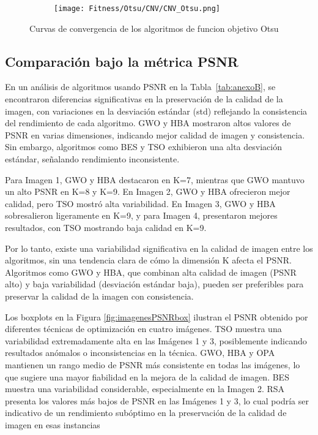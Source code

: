 \documentclass[conference]{IEEEtran}
\begin{document}
\begin{figure}
	\centering
	\begin{subfigure}{0.5\textwidth}
		\texttt{[image: Fitness/Otsu/CNV/CNV\_Otsu.png]}
	\end{subfigure}
	\caption{Curvas de convergencia de los algoritmos de funcion objetivo Otsu}
	\label{fig:imagenes}    
\end{figure}


\subsection{Comparación bajo la métrica PSNR}
\noindent En un análisis de algoritmos usando PSNR en la Tabla~\ref{tab:anexoB}, se encontraron diferencias significativas en la preservación de la calidad de la imagen, con variaciones en la desviación estándar (std) reflejando la consistencia del rendimiento de cada algoritmo. GWO y HBA mostraron altos valores de PSNR en varias dimensiones, indicando mejor calidad de imagen y consistencia. Sin embargo, algoritmos como BES y TSO exhibieron una alta desviación estándar, señalando rendimiento inconsistente.

\noindent Para Imagen 1, GWO y HBA destacaron en K=7, mientras que GWO mantuvo un alto PSNR en K=8 y K=9. En Imagen 2, GWO y HBA ofrecieron mejor calidad, pero TSO mostró alta variabilidad. En Imagen 3, GWO y HBA sobresalieron ligeramente en K=9, y para Imagen 4, presentaron mejores resultados, con TSO mostrando baja calidad en K=9.

\noindent Por lo tanto, existe una variabilidad significativa en la calidad de imagen entre los algoritmos, sin una tendencia clara de cómo la dimensión K afecta el PSNR. Algoritmos como GWO y HBA, que combinan alta calidad de imagen (PSNR alto) y baja variabilidad (desviación estándar baja), pueden ser preferibles para preservar la calidad de la imagen con consistencia.

\noindent Los boxplots en la Figura \ref{fig:imagenesPSNRbox} ilustran el PSNR obtenido por diferentes técnicas de optimización en cuatro imágenes. TSO muestra una variabilidad extremadamente alta en las Imágenes 1 y 3, posiblemente indicando resultados anómalos o inconsistencias en la técnica. GWO, HBA y OPA mantienen un rango medio de PSNR más consistente en todas las imágenes, lo que sugiere una mayor fiabilidad en la mejora de la calidad de imagen. BES muestra una variabilidad considerable, especialmente en la Imagen 2. RSA presenta los valores más bajos de PSNR en las Imágenes 1 y 3, lo cual podría ser indicativo de un rendimiento subóptimo en la preservación de la calidad de imagen en esas instancias
\end{document}
